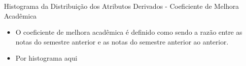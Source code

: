 \begin{frame}{Histograma da Distribuição dos Atributos Derivados - Coeficiente de
    Melhora Acadêmica}
\begin{itemize}[itemsep=3ex]
        \item O coeficiente de melhora acadêmica é definido como sendo a razão entre
            as notas do semestre anterior e as notas do semestre anterior ao
            anterior.
        \item Por histograma aqui
\end{itemize}
\end{frame}
